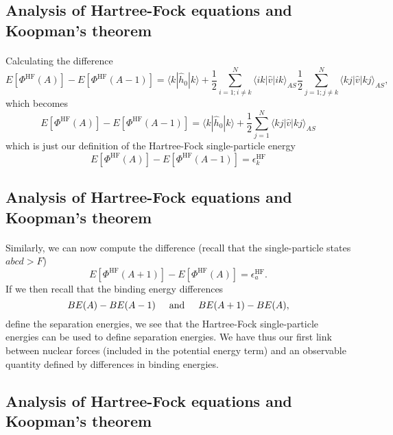 \documentclass[%
twoside,                 %
final,                   %
10pt]{article}
\begin{document}
\subsection*{Analysis of Hartree-Fock equations and Koopman's theorem}

\paragraph{}
Calculating the difference 
\[
  E[\Phi^{\mathrm{HF}}(A)]-   E[\Phi^{\mathrm{HF}}(A-1)] 
  = \langle k | \hat{h}_0 | k \rangle +
  \frac{1}{2}\sum_{i=1;i\ne k}^N\langle ik|\hat{v}|ik\rangle_{AS}  \frac{1}{2}\sum_{j=1;j\ne k}^N\langle kj|\hat{v}|kj\rangle_{AS},
\]
which becomes 
\[
  E[\Phi^{\mathrm{HF}}(A)]-   E[\Phi^{\mathrm{HF}}(A-1)] 
  = \langle k | \hat{h}_0 | k \rangle +
  \frac{1}{2}\sum_{j=1}^N\langle kj|\hat{v}|kj\rangle_{AS}
\]
which is just our definition of the Hartree-Fock single-particle energy
\[
  E[\Phi^{\mathrm{HF}}(A)]-   E[\Phi^{\mathrm{HF}}(A-1)] 
  = \epsilon_k^{\mathrm{HF}} 
\]



\subsection*{Analysis of Hartree-Fock equations and Koopman's theorem}

\paragraph{}
Similarly, we can now compute the difference (recall that the single-particle states $abcd > F$)
\[
  E[\Phi^{\mathrm{HF}}(A+1)]-   E[\Phi^{\mathrm{HF}}(A)]= \epsilon_a^{\mathrm{HF}}. 
\]
If we then recall that the binding energy differences 
\[
BE(A)-BE(A-1) \hspace{0.5cm} \mathrm{and} \hspace{0.5cm} BE(A+1)-BE(A), 
\]
define the separation energies, we see that the Hartree-Fock single-particle energies can be used to
define separation energies. We have thus our first link between nuclear forces (included in the potential energy term) and an observable quantity defined by differences in binding energies.



\subsection*{Analysis of Hartree-Fock equations and Koopman's theorem}
\end{document}
